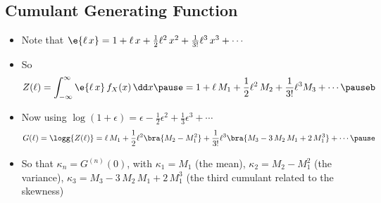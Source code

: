 \begin{slide}
\section{Cumulant Generating Function}
  
\begin{PauseHighLight}
  \begin{itemize}
  \item Note that $\e{\ell\,x} = 1 + \ell\,x + \tfrac{1}{2}
    \ell^2\,x^2 + \tfrac{1}{3!} \ell^3\,x^3 + \cdots$\pause
  \item So
    \begin{align*}
      Z(\ell) =  \int_{-\infty}^\infty \e{\ell \, x} \, f_X(x) \, \dd
      x\pause
      = 1 + \ell\, M_1 + \frac{1}{2} \ell^2\, M_2 +  \frac{1}{3!}
      \ell^3 M_3 + \cdots\pauseb
    \end{align*}
  \item Now using $\log(1+\epsilon) = \epsilon - \tfrac{1}{2}
    \epsilon^2 + \tfrac{1}{3} \epsilon^3 + \cdots$
    {\small
    \begin{align*}
      G(\ell) = \logg{Z(\ell)} = \ell\,M_1 +  \frac{1}{2}
      \ell^2\bra{M_2 - M_1^2} +  \frac{1}{3!}
      \ell^3 \bra{M_3 - 3\, M_2\,M_1 + 2\,M_1^3} + \cdots\pause
    \end{align*}}
  \item So that $\kappa_n=G^{(n)}(0)$, with $\kappa_1=M_1$ (the mean),
    $\kappa_2 = M_2-M_1^2$ (the variance), $\kappa_3 = M_3 - 3\,
    M_2\,M_1 + 2\,M_1^3$ (the third cumulant related to the skewness)\pause
  \end{itemize}
\end{PauseHighLight}

\end{slide}


